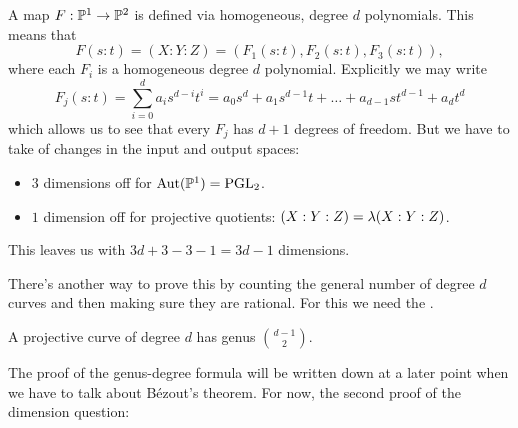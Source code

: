 \documentclass[12pt]{memoir}
\begin{document}
\begin{ptcbp}
A map $F:\mathbb{P}^1\to\mathbb{P}^2$ is defined via homogeneous, degree $d$ polynomials. This means that 
$$F(s:t)=(X:Y:Z)=(F_1(s:t),F_2(s:t),F_3(s:t)),$$
where each $F_i$ is a homogeneous degree $d$ polynomial. Explicitly we may write 
$$F_j(s:t)=\sum_{i=0}^da_is^{d-i}t^{i}=a_0s^d+a_1s^{d-1}t+\dots+a_{d-1}st^{d-1}+a_dt^d$$
which allows us to see that every $F_j$ has $d+1$ degrees of freedom. But we have to take of changes in the input and output spaces:
\begin{itemize}
    \item $3$ dimensions off for $\operatorname{Aut}(\mathbb{P}^1)=\operatorname{PGL}_2$.
    \item $1$ dimension off for projective quotients: $(X:Y:Z)=\lambda(X:Y:Z)$.
\end{itemize}
This leaves us with $3d+3-3-1=3d-1$ dimensions. 
\end{ptcbp}

There's another way to prove this by counting the general number of degree $d$ curves and then making sure they are rational. For this we need the .

\begin{Prop}\label{prop-genus-degree-formula}
    A projective curve of degree $d$ has genus $\binom{d-1}{2}$.
\end{Prop}

The proof of the genus-degree formula will be written down at a later point when we have to talk about Bézout's theorem. For now, the second proof of the dimension question:
\end{document}
